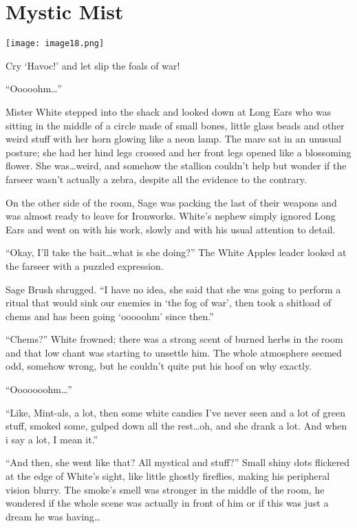 \chapter{Mystic Mist}

\texttt{[image: image18.png]}

\begin{intro}
    Cry `Havoc!' and let slip the foals of war!
\end{intro}


``Ooooohm\dots''

Mister White stepped into the shack and looked down at Long Ears who was sitting in the middle of a circle made of small bones, little glass beads and other weird stuff with her horn glowing like a neon lamp. The mare sat in an unusual posture; she had her hind legs crossed and her front legs opened like a blossoming flower. She was\dots weird, and somehow the stallion couldn't help but wonder if the farseer wasn't actually a zebra, despite all the evidence to the contrary.

On the other side of the room, Sage was packing the last of their weapons and was almost ready to leave for Ironworks. White's nephew simply ignored Long Ears and went on with his work, slowly and with his usual attention to detail.

``Okay, I'll take the bait\dots what is she doing?'' The White Apples leader looked at the farseer with a puzzled expression.

Sage Brush shrugged. ``I have no idea, she said that she was going to perform a ritual that would sink our enemies in `the fog of war', then took a shitload of chems and has been going `ooooohm' since then.''

``Chems?'' White frowned; there was a strong scent of burned herbs in the room and that low chant was starting to unsettle him. The whole atmosphere seemed odd, somehow wrong, but he couldn't quite put his hoof on why exactly.

``Ooooooohm\dots''

``Like, Mint-als, a lot, then some white candies I've never seen and a lot of green stuff, smoked some, gulped down all the rest\dots oh, and she drank a lot. And when i say a lot, I mean it.''

``And then, she went like that? All mystical and stuff?'' Small shiny dots flickered at the edge of White's sight, like little ghostly fireflies, making his peripheral vision blurry. The smoke's smell was stronger in the middle of the room, he wondered if the whole scene was actually in front of him or if this was just a dream he was having\dots

